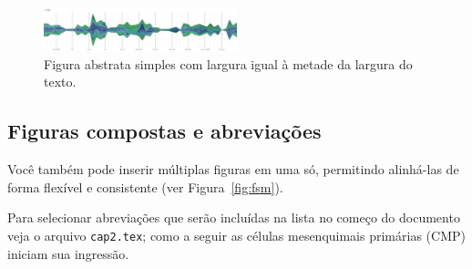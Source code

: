 \begin{figure}[htbp]
    \centering
    \includegraphics[width=0.5\textwidth]{lastgraph}
    \caption[Outra figura simples]{Figura abstrata simples com largura igual à metade da largura do texto.}
    \label{fig:last2}
\end{figure}

\subsection{Figuras compostas e abreviações}\label{cap2:res:figs2}

Você também pode inserir múltiplas figuras em uma só, permitindo alinhá-las de forma flexível e consistente (ver Figura~\ref{fig:fsm}).

Para selecionar abreviações que serão incluídas na lista no começo do documento veja o arquivo \texttt{cap2.tex}; como a seguir as células mesenquimais primárias (CMP) iniciam sua ingressão.%

